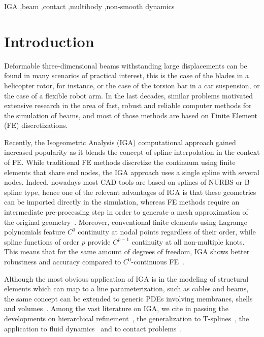 \documentclass[review]{elsarticle}
\begin{document}
\begin{keyword}
IGA \sep beam \sep contact \sep multibody \sep non-smooth dynamics
\end{keyword}

\maketitle




\section{Introduction}

Deformable three-dimensional beams withstanding large displacements can be found in many scenarios of practical interest, this is the case of the blades in a helicopter rotor, for instance, or the case of the torsion bar in a car suspension, or the case of a flexible robot arm. In the last decades, similar problems motivated extensive research in the area of fast, robust and reliable computer methods for the simulation of beams, and most of those methods are based on Finite Element (FE) discretizations.

Recently, the Isogeometric Analysis (IGA) computational approach gained increased popularity as it blends the concept of spline interpolation in the context of FE. 
While traditional FE methods discretize the continuum using finite elements that share end nodes, the IGA approach uses a single spline with several nodes. Indeed, nowadays most CAD tools are based on splines of NURBS or B-spline type, hence one of the relevant advantages of IGA is that these geometries can be imported directly in the simulation, whereas FE methods require an intermediate pre-processing step in order to generate a mesh approximation of the original geometry~\cite{HUGHES2005}. Moreover, conventional finite elements using Lagrange polynomials feature $C^0$ continuity at nodal points regardless of their order, while spline functions of order $p$ provide $C^{p-1}$ continuity at all non-multiple knots. This  means that for the same amount of degrees of freedom, IGA shows better robustness and accuracy compared to $C^0$-continuous FE~\cite{COTTRELL2007refinement}.

Although the most obvious application of IGA is in the modeling of structural elements which can map to a line parameterization, such as cables and beams, the same concept can be extended to generic PDEs involving membranes, shells and volumes~\cite{COTTRELL20065257,Benson2010IGAShells}.
Among the vast literature on IGA, we cite in passing the developments on hierarchical refinement~\cite{VUONGSIMEON2011hierarchical}, the generalization to T-splines~\cite{BAZILEVS2010tsplines}, the application to fluid dynamics~\cite{Bazilevs2008fluid} and to contact problems~\cite{Wriggers2012mortar,TEMIZER2014interiorpoint}.
\end{document}
